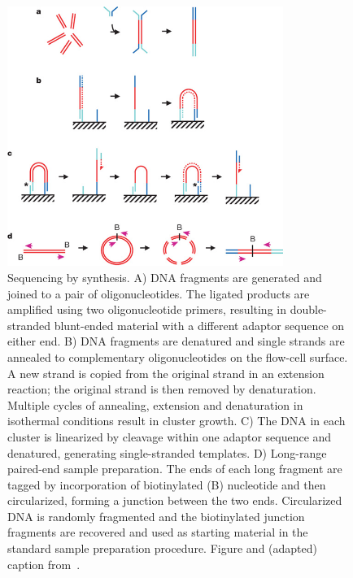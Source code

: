 \begin{figure}
\centerline{\includegraphics[width=0.8\textwidth]{illumina/illumina_sequencing.jpg}}
\caption{Sequencing by synthesis. A) DNA fragments are generated and joined to a pair of oligonucleotides. The ligated products are amplified using two oligonucleotide primers, resulting in double-stranded blunt-ended material with a different adaptor sequence on either end. B) DNA fragments are denatured and single strands are annealed to complementary oligonucleotides on the flow-cell surface. A new strand is copied from the original strand in an extension reaction; the original strand is then removed by denaturation. Multiple cycles of annealing, extension and denaturation in isothermal conditions result in cluster growth. C) The DNA in each cluster is linearized by cleavage within one adaptor sequence and denatured, generating single-stranded templates. D) Long-range paired-end sample preparation. The ends of each long fragment are tagged by incorporation of biotinylated (B) nucleotide and then circularized, forming a junction between the two ends. Circularized DNA is randomly fragmented and the biotinylated junction fragments are recovered and used as starting material in the standard sample preparation procedure. Figure and (adapted) caption from~\cite{bentley2008}.}
\label{fig:illumina}
\end{figure} 

